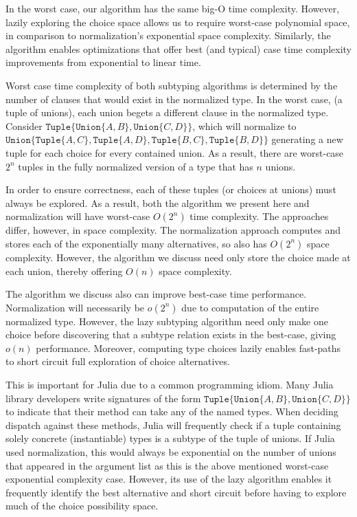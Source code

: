 \documentclass[a4paper,english]{lipics-v2019}
\newcommand{\xt}[1]{\texttt{#1}}
\newcommand{\union}[2]{\xt{Union\{}#1,#2\xt{\}}}
\newcommand{\tuple}[1]{\xt{Tuple\{}#1\xt{\}}}
\begin{document}
In the worst case, our algorithm has the same big-O time complexity. However,
lazily exploring the choice space allows us to require worst-case polynomial
space, in comparison to normalization's exponential space complexity.
Similarly, the algorithm enables optimizations that offer best (and typical)
case time complexity improvements from exponential to linear time.

Worst case time complexity of both subtyping algorithms is determined by the
number of clauses that would exist in the normalized type. In the worst case,
(a tuple of unions), each union begets a different clause in the normalized
type. Consider $\tuple{\union{A}{B}, \union{C}{D}}$, which will normalize to
$\union{\tuple{A,C}}{\tuple{A, D}, \tuple{B, C}, \tuple{B, D}}$ generating a 
new tuple for each choice for every contained union. As a result, there are
worst-case $2^n$ tuples in the fully normalized version of a type that has $n$
unions.

In order to ensure correctness, each of these tuples (or choices at unions)
must always be explored. As a result, both the algorithm we present here and
normalization will have worst-case $O(2^n)$ time complexity. The approaches
differ, however, in space complexity. The normalization approach computes and
stores each of the exponentially many alternatives, so also has $O(2^n)$ space
complexity. However, the algorithm we discuss need only store the choice made
at each union, thereby offering $O(n)$ space complexity.

The algorithm we discuss also can improve best-case time performance.
Normalization will necessarily be $o(2^n)$ due to computation of the entire
normalized type. However, the lazy subtyping algorithm need only make one
choice before discovering that a subtype relation exists in the best-case,
giving $o(n)$ performance. Moreover, computing type choices lazily enables
fast-paths to short circuit full exploration of choice alternatives.

This is important for Julia due to a common programming idiom. Many Julia
library developers write signatures of the form $\tuple{\union{A}{B},
\union{C}{D}}$ to indicate that their method can take any of the named
types. When deciding dispatch against these methods, Julia will frequently
check if a tuple containing solely concrete (instantiable) types is a subtype 
of the tuple of unions. If Julia used normalization, this would always be 
exponential on the number of unions that appeared in the argument list as this
is the above mentioned worst-case exponential complexity case. However, its use
of the lazy algorithm enables it frequently identify the best alternative and
short circuit before having to explore much of the choice possibility space.
\end{document}
